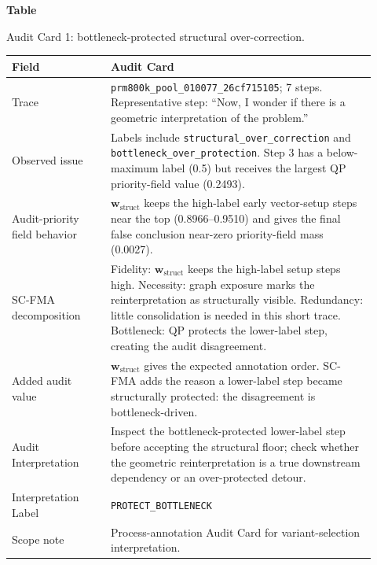 \documentclass[pdflatex,sn-mathphys-num]{sn-jnl}
\newcommand{\wstruct}{\ensuremath{\mathbf{w}_{\mathrm{struct}}}}
\begin{document}
\par\medskip
{}\label{tab:audit-card-geometric}
\noindent\textbf{Table~\thetable}\par
\noindent Audit Card 1: bottleneck-protected structural over-correction.
\begin{center}
\small
\renewcommand{\arraystretch}{1.08}
\begin{tabular}{p{0.25\linewidth}p{0.67\linewidth}}
\toprule
\textbf{Field} & \textbf{Audit Card} \\
\midrule
Trace & \texttt{prm800k\_pool\_010077\_26cf715105}; 7 steps. Representative step: ``Now, I wonder if there is a geometric interpretation of the problem.'' \\
Observed issue & Labels include \texttt{structural\_over\_correction} and \texttt{bottleneck\_over\_protection}. Step 3 has a below-maximum label (0.5) but receives the largest QP priority-field value (0.2493). \\
Audit-priority field behavior & \wstruct{} keeps the high-label early vector-setup steps near the top (0.8966--0.9510) and gives the final false conclusion near-zero priority-field mass (0.0027). \\
SC-FMA decomposition & Fidelity: \wstruct{} keeps the high-label setup steps high. Necessity: graph exposure marks the reinterpretation as structurally visible. Redundancy: little consolidation is needed in this short trace. Bottleneck: QP protects the lower-label step, creating the audit disagreement. \\
Added audit value & \wstruct{} gives the expected annotation order. SC-FMA adds the reason a lower-label step became structurally protected: the disagreement is bottleneck-driven. \\
Audit Interpretation & Inspect the bottleneck-protected lower-label step before accepting the structural floor; check whether the geometric reinterpretation is a true downstream dependency or an over-protected detour. \\
Interpretation Label & \texttt{PROTECT\_BOTTLENECK} \\
Scope note & Process-annotation Audit Card for variant-selection interpretation. \\
\bottomrule
\end{tabular}
\end{center}
\medskip
\end{document}

